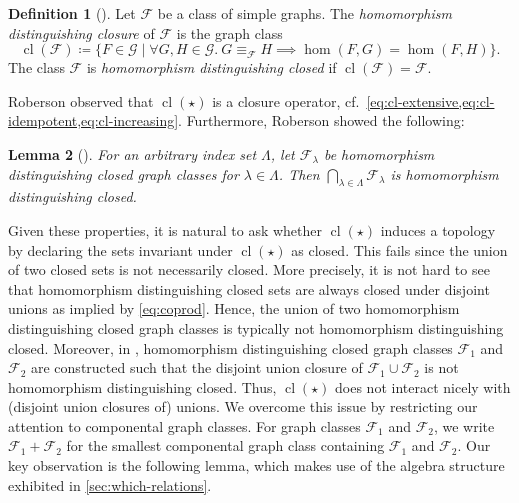 \documentclass[11pt]{scrartcl}
\theoremstyle{definition}
\newtheorem{definition}{Definition}[section]
\theoremstyle{plain}
\newtheorem{lemma}[definition]{Lemma}
\theoremstyle{remark}
\DeclareMathOperator{\cl}{cl}
\newcommand{\G}{\mathcal{G}}
\begin{document}
	\begin{definition}[\textcite{roberson_oddomorphisms_2022}]
    \label{def:closure}
		Let $\mathcal{F}$ be a class of simple graphs.
		The \emph{homomorphism distinguishing closure} of $\mathcal{F}$ is
		the graph class
		\[
		\cl(\mathcal{F}) \coloneqq \{F \in \G \mid \forall G, H \in \G.\ G \equiv_{\mathcal{F}} H \implies \hom(F, G) = \hom(F, H) \}.
 		\]
		The class $\mathcal{F}$ is \emph{homomorphism distinguishing closed}
		if $\cl(\mathcal{F}) = \mathcal{F}$.
	\end{definition}

	Roberson observed that $\cl(\star)$ is a closure operator, cf.\ \cref{eq:cl-extensive,eq:cl-idempotent,eq:cl-increasing}.
	Furthermore, Roberson showed the following:

	\begin{lemma}[]\label{lem:intersections}
    For an arbitrary index set $\Lambda$,
		let $\mathcal{F}_\lambda$ be homomorphism distinguishing closed graph classes for $\lambda \in \Lambda$.
		Then $\bigcap_{\lambda \in \Lambda} \mathcal{F}_\lambda$ is homomorphism distinguishing closed.
	\end{lemma}
	
	Given these properties, it is natural to ask whether $\cl(\star)$ induces a topology by declaring the sets invariant under $\cl(\star)$ as closed.
	This fails since the union of two closed sets is not necessarily closed.
	More precisely,
	it is not hard to see that homomorphism distinguishing 
	closed sets are always closed under disjoint unions as implied by \cref{eq:coprod}.
	Hence, the union of two homomorphism distinguishing closed graph classes is typically not homomorphism distinguishing closed.
	Moreover, in \cite[Example~34]{seppelt_logical_2024}, homomorphism distinguishing closed graph classes $\mathcal{F}_1$ and $\mathcal{F}_2$ are constructed such that the disjoint union closure of $\mathcal{F}_1 \cup \mathcal{F}_2$ is not homomorphism distinguishing closed.
	Thus, $\cl(\star)$ does not interact nicely with (disjoint union closures of) unions.
	We overcome this issue by restricting our attention to componental graph classes.
	For graph classes $\mathcal{F}_1$ and $\mathcal{F}_2$,
	we write $\mathcal{F}_1 + \mathcal{F}_2$ for the smallest componental graph class containing $\mathcal{F}_1$ and $\mathcal{F}_2$.
	Our key observation is the following lemma, which makes use of the algebra structure exhibited in \cref{sec:which-relations}.
\end{document}
